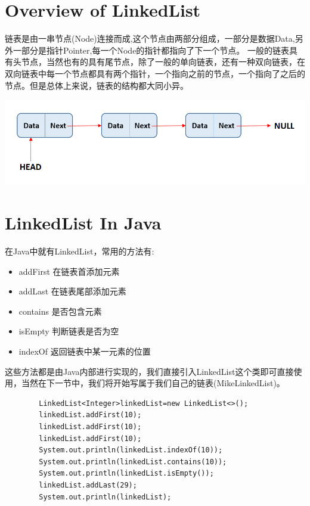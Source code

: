 \documentclass[
	11pt,
	fleqn,
	a4paper,
]{LegrandOrangeBook}
\begin{document}
\section{Overview of LinkedList}
链表是由一串节点(Node)连接而成,这个节点由两部分组成，一部分是数据Data,另外一部分是指针Pointer,每一个Node的指针都指向了下一个节点。
一般的链表具有头节点，当然也有的具有尾节点，除了一般的单向链表，还有一种双向链表，在双向链表中每一个节点都具有两个指针，一个指向之前的节点，一个指向了之后的节点。但是总体上来说，链表的结构都大同小异。

\begin{center}
    \includegraphics[scale=0.8]{Images/linked-list.jpg}
\end{center}
\section{LinkedList In Java}
在Java中就有LinkedList，常用的方法有:
\begin{itemize}
    \item addFirst 在链表首添加元素
    \item addLast 在链表尾部添加元素
    \item contains 是否包含元素
    \item isEmpty 判断链表是否为空
    \item indexOf 返回链表中某一元素的位置
\end{itemize}
这些方法都是由Java内部进行实现的，我们直接引入LinkedList这个类即可直接使用，当然在下一节中，我们将开始写属于我们自己的链表(MikeLinkedList)。

\begin{verbatim}
        LinkedList<Integer>linkedList=new LinkedList<>();
        linkedList.addFirst(10);
        linkedList.addFirst(10);
        linkedList.addFirst(10);
        System.out.println(linkedList.indexOf(10));
        System.out.println(linkedList.contains(10));
        System.out.println(linkedList.isEmpty());
        linkedList.addLast(29);
        System.out.println(linkedList);
\end{verbatim}
\end{document}
